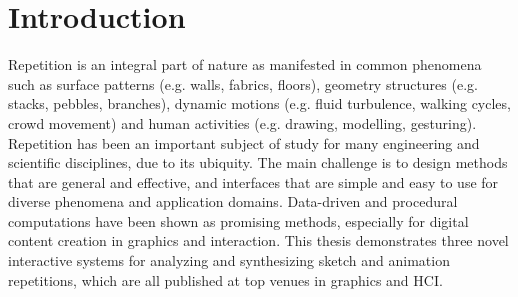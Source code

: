 \chapter{Introduction}
\label{sec:introduction}

Repetition is an integral part of nature as manifested in common phenomena such as surface patterns (e.g. walls, fabrics, floors), geometry structures (e.g. stacks, pebbles, branches), dynamic motions (e.g. fluid turbulence, walking cycles, crowd movement) and human activities (e.g. drawing, modelling, gesturing).
Repetition has been an important subject of study for many engineering and scientific disciplines, due to its ubiquity.
The main challenge is to design methods that are general and effective, and interfaces that are simple and easy to use for diverse phenomena and application domains.
Data-driven and procedural computations have been shown as promising methods, especially for digital content creation in graphics and interaction.
This thesis demonstrates three novel interactive systems for analyzing and synthesizing sketch and animation repetitions, which are all published at top venues in graphics and HCI.


